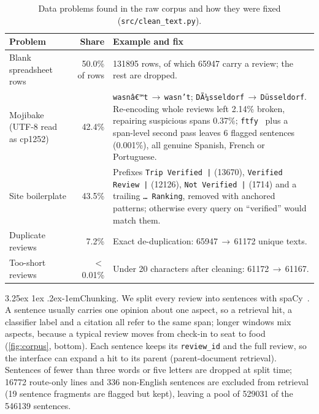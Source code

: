 \documentclass[10pt,twocolumn,a4paper]{article}
\makeatletter
\renewcommand\paragraph{\@startsection{paragraph}{4}{\parindent}%
  {3.25ex \@plus 1ex \@minus .2ex}{-1em}{\normalfont\normalsize\bfseries}}
\makeatother
\begin{document}
\begin{table}[t]
\centering\small
\caption{Data problems found in the raw corpus and how they were fixed (\nolinkurl{src/clean_text.py}).}
\label{tab:cleaning}
\begin{tabularx}{\textwidth}{@{}P{42mm}rY@{}}
\toprule
\textbf{Problem} & \textbf{Share} & \textbf{Example and fix} \\
\midrule
Blank spreadsheet rows & 50.0\% of rows & \num{131895} rows, of which \num{65947} carry a review; the rest are dropped. \\
Mojibake (UTF-8 read as cp1252) & 42.4\% & \texttt{wasnâ€™t}\,$\to$\,\texttt{wasn't}; \texttt{DÃ¼sseldorf}\,$\to$\,\texttt{Düsseldorf}. Re-encoding whole reviews left 2.14\% broken, repairing suspicious spans 0.37\%; \texttt{ftfy}~\cite{ftfy} plus a span-level second pass leaves 6 flagged sentences (0.001\%), all genuine Spanish, French or Portuguese. \\
Site boilerplate & 43.5\% & Prefixes \texttt{Trip Verified |} (\num{13670}), \texttt{Verified Review |} (\num{12126}), \texttt{Not Verified |} (\num{1714}) and a trailing \texttt{… Ranking}, removed with anchored patterns; otherwise every query on ``verified'' would match them. \\
Duplicate reviews & 7.2\% & Exact de-duplication: \num{65947}\,$\to$\,\num{61172} unique texts. \\
Too-short reviews & $<$0.01\% & Under 20 characters after cleaning: \num{61172}\,$\to$\,\num{61167}. \\
\bottomrule
\end{tabularx}
\end{table}

\paragraph{Chunking.} We split every review into sentences with spaCy~\cite{spacy}. A sentence usually carries one
opinion about one aspect, so a retrieval hit, a classifier label and a citation all refer to the same span; longer
windows mix aspects, because a typical review moves from check-in to seat to food (\cref{fig:corpus}, bottom). Each
sentence keeps its \nolinkurl{review_id} and the full review, so the interface can expand a hit to its parent
(parent-document retrieval). Sentences of fewer than three words or five letters are dropped at split time;
\num{16772} route-only lines and 336 non-English sentences are excluded from retrieval (19 sentence fragments are
flagged but kept), leaving a pool of \num{529031} of the \num{546139} sentences.
\end{document}

